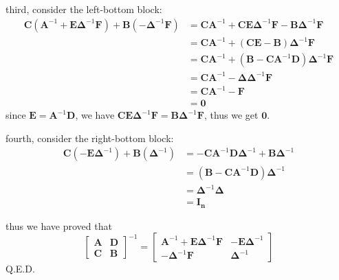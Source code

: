 \documentclass[12pt,a4paper]{article}
\begin{document}
third, consider the left-bottom block:
\[
    \begin{aligned}
        \mathbf{\mathbf{C}}(\mathbf{A}^{-1}+\mathbf{E}\mathbf{\Delta}^{-1}\mathbf{F}) + \mathbf{B}(-\mathbf{\Delta}^{-1}\mathbf{F}) 
        & = \mathbf{CA}^{-1} + \mathbf{CE}\mathbf{\Delta}^{-1}\mathbf{F} - \mathbf{B}\mathbf{\Delta}^{-1}\mathbf{F} \\
                                                & = \mathbf{CA}^{-1} + (\mathbf{CE} - \mathbf{B})\mathbf{\Delta}^{-1}\mathbf{F} \\
                                                & = \mathbf{CA}^{-1} + (\mathbf{B} - \mathbf{CA}^{-1}\mathbf{D})\mathbf{\Delta}^{-1}\mathbf{F} \\
                                                & = \mathbf{CA}^{-1} - \mathbf{\Delta} \mathbf{\Delta}^{-1} \mathbf{F} \\
                                                & = \mathbf{CA}^{-1} - \mathbf{F} \\
                                                & = \mathbf{0}
    \end{aligned}
\]
since $\mathbf{E} = \mathbf{A}^{-1}\mathbf{D}$, we have $\mathbf{CE}\mathbf{\Delta}^{-1}\mathbf{F} = \mathbf{B}\mathbf{\Delta}^{-1}\mathbf{F}$, thus we get $\mathbf{0}$.

fourth, consider the right-bottom block:
\[
    \begin{aligned}
        \mathbf{\mathbf{C}}(-\mathbf{E}\mathbf{\Delta}^{-1}) + \mathbf{B}(\mathbf{\Delta}^{-1}) & = -\mathbf{CA}^{-1}\mathbf{D}\mathbf{\Delta}^{-1} + \mathbf{B}\mathbf{\Delta}^{-1} \\
                                          & = (\mathbf{B} - \mathbf{CA}^{-1}\mathbf{D})\mathbf{\Delta}^{-1} \\
                                          & = \mathbf{\Delta}^{-1}\mathbf{\Delta} \\
                                          & = \mathbf{I_n}
    \end{aligned}
\]

thus we have proved that
\[
    \begin{bmatrix}
        \mathbf{A} & \mathbf{D} \\
        \mathbf{\mathbf{C}} & \mathbf{B}
    \end{bmatrix}^{-1} = \begin{bmatrix}
        \mathbf{A}^{-1}+\mathbf{E}\mathbf{\Delta}^{-1}\mathbf{F} & -\mathbf{E}\mathbf{\Delta}^{-1} \\
        -\mathbf{\Delta}^{-1}\mathbf{F} & \mathbf{\Delta}^{-1}
    \end{bmatrix}
\]
Q.E.D.
\end{document}
